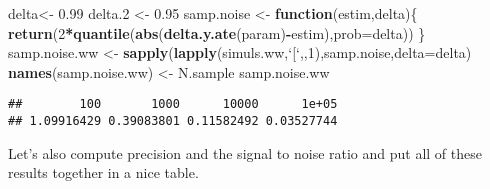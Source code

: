 \documentclass[]{book}
\newenvironment{Shaded}{\begin{snugshade}}{\end{snugshade}}
\newcommand{\KeywordTok}[1]{\textcolor[rgb]{0.13,0.29,0.53}{\textbf{#1}}}
\newcommand{\DataTypeTok}[1]{\textcolor[rgb]{0.13,0.29,0.53}{#1}}
\newcommand{\DecValTok}[1]{\textcolor[rgb]{0.00,0.00,0.81}{#1}}
\newcommand{\FloatTok}[1]{\textcolor[rgb]{0.00,0.00,0.81}{#1}}
\newcommand{\StringTok}[1]{\textcolor[rgb]{0.31,0.60,0.02}{#1}}
\newcommand{\ControlFlowTok}[1]{\textcolor[rgb]{0.13,0.29,0.53}{\textbf{#1}}}
\newcommand{\OperatorTok}[1]{\textcolor[rgb]{0.81,0.36,0.00}{\textbf{#1}}}
\newcommand{\NormalTok}[1]{#1}
\theoremstyle{definition}
\theoremstyle{definition}
\theoremstyle{definition}
\theoremstyle{remark}
\begin{document}
\begin{Shaded}
\begin{Highlighting}[]
\NormalTok{delta<-}\StringTok{ }\FloatTok{0.99}
\NormalTok{delta.}\DecValTok{2}\NormalTok{ <-}\StringTok{ }\FloatTok{0.95}
\NormalTok{samp.noise <-}\StringTok{ }\ControlFlowTok{function}\NormalTok{(estim,delta)\{}
  \KeywordTok{return}\NormalTok{(}\DecValTok{2}\OperatorTok{*}\KeywordTok{quantile}\NormalTok{(}\KeywordTok{abs}\NormalTok{(}\KeywordTok{delta.y.ate}\NormalTok{(param)}\OperatorTok{-}\NormalTok{estim),}\DataTypeTok{prob=}\NormalTok{delta))}
\NormalTok{\}}
\NormalTok{samp.noise.ww <-}\StringTok{ }\KeywordTok{sapply}\NormalTok{(}\KeywordTok{lapply}\NormalTok{(simuls.ww,}\StringTok{`}\DataTypeTok{[}\StringTok{`}\NormalTok{,,}\DecValTok{1}\NormalTok{),samp.noise,}\DataTypeTok{delta=}\NormalTok{delta)}
\KeywordTok{names}\NormalTok{(samp.noise.ww) <-}\StringTok{ }\NormalTok{N.sample}
\NormalTok{samp.noise.ww}
\end{Highlighting}
\end{Shaded}

\begin{verbatim}
##        100       1000      10000      1e+05 
## 1.09916429 0.39083801 0.11582492 0.03527744
\end{verbatim}

Let's also compute precision and the signal to noise ratio and put all
of these results together in a nice table.
\end{document}
